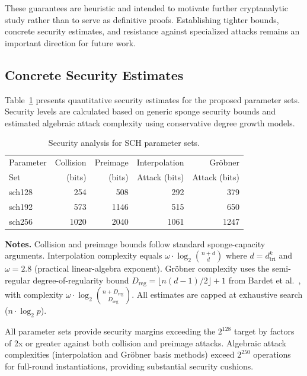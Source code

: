 ﻿\documentclass[english]{aucmcs}
\begin{document}
These guarantees are heuristic and intended to motivate further cryptanalytic study rather than to serve as definitive proofs. Establishing tighter bounds, concrete security estimates, and resistance against specialized attacks remains an important direction for future work.



\subsection{Concrete Security Estimates}
\label{sec:concrete-security}

Table~\ref{tab:security} presents quantitative security estimates for the proposed parameter sets. Security levels are calculated based on generic sponge security bounds and estimated algebraic attack complexity using conservative degree growth models.

\begin{table}[H]
\centering
\caption{Security analysis for SCH parameter sets.}
\label{tab:security}
\begin{tabular}{@{}lrrrr@{}}
\toprule
Parameter & Collision & Preimage & Interpolation & Gr\"obner \\
Set & (bits) & (bits) & Attack (bits) & Attack (bits) \\
\midrule
sch128 & 254 & 508 & 292 & 379 \\
sch192 & 573 & 1146 & 515 & 650 \\
sch256 & 1020 & 2040 & 1061 & 1247 \\
\bottomrule
\end{tabular}
\vspace{0.5em}
\begin{minipage}{0.95\linewidth}
\small
\textbf{Notes.} Collision and preimage bounds follow standard sponge-capacity arguments.
Interpolation complexity equals $\omega \cdot \log_2 \binom{n+d}{d}$ where $d = d_{\mathrm{tri}}^k$
and $\omega = 2.8$ (practical linear-algebra exponent).
Gr\"obner complexity uses the semi-regular degree-of-regularity bound
$D_{\mathrm{reg}} = \lfloor n(d-1)/2 \rfloor + 1$ from Bardet et al.\ \cite{Bardet2005},
with complexity $\omega \cdot \log_2 \binom{n+D_{\mathrm{reg}}}{D_{\mathrm{reg}}}$.
All estimates are capped at exhaustive search ($n \cdot \log_2 p$).
\end{minipage}
\end{table}

All parameter sets provide security margins exceeding the $2^{128}$ target by factors of 2x or greater against both collision and preimage attacks. Algebraic attack complexities (interpolation and Gr\"obner basis methods) exceed $2^{250}$ operations for full-round instantiations, providing substantial security cushions.
\end{document}
